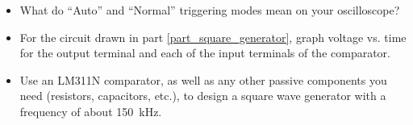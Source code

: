 \begin{itemize}


\item What do ``Auto'' and ``Normal'' triggering modes mean on your oscilloscope?

\item For the circuit drawn in part \ref{part_square_generator}, graph voltage vs. time for the output terminal and each of the input terminals of the comparator.


\item Use an LM311N comparator, as well as any other passive components you need (resistors, capacitors, etc.), to design a square wave generator with a frequency of about 150~kHz.

\end{itemize}






